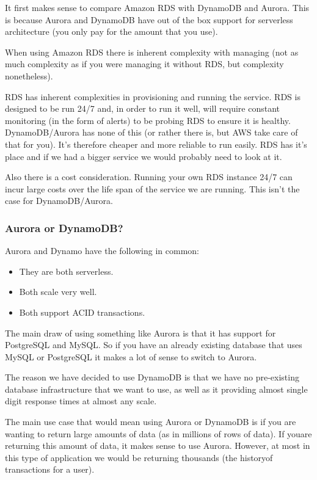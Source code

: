 \documentclass[runningheads]{llncs}
\begin{document}
It first makes sense to compare Amazon RDS with DynamoDB and Aurora. This is because Aurora and DynamoDB have out of the box support for serverless architecture (you only pay for the amount that you use).

When using Amazon RDS there is inherent complexity with managing (not as much complexity as if you were managing it without RDS, but complexity nonetheless).

RDS has inherent complexities in provisioning and running the service. RDS is designed to be run 24/7 and, in order to run it well, will require constant monitoring (in the form of alerts) to be probing RDS to ensure it is healthy.  DynamoDB/Aurora has none of this (or rather there is, but AWS take care of that for you).  It's therefore cheaper and more reliable to run easily. RDS has it's place and if we had a bigger service we would probably need to look at it.

Also there is a cost consideration.  Running your own RDS instance 24/7 can incur large costs over the life span of the service we are running.  This isn't the case for DynamoDB/Aurora.

\subsubsection{Aurora or DynamoDB?}
Aurora and Dynamo have the following in common:

\begin{itemize}
	\item They are both serverless.
	\item Both scale very well.
	\item Both support ACID transactions.
\end{itemize}

The main draw of using something like Aurora is that it has support for PostgreSQL and MySQL. So if you have an already existing database that uses MySQL or PostgreSQL it makes a lot of sense to switch to Aurora.

The reason we have decided to use DynamoDB is that we have no pre-existing database infrastructure that we want to use, as well as it providing almost single digit response times at almost any scale.

The main use case that would mean using Aurora or DynamoDB is if you are wanting to return large amounts of data (as in millions of rows of data). If youare returning this amount of data, it makes sense to use Aurora. However, at most in this type of application we would be returning thousands (the historyof transactions for a user).
\end{document}
